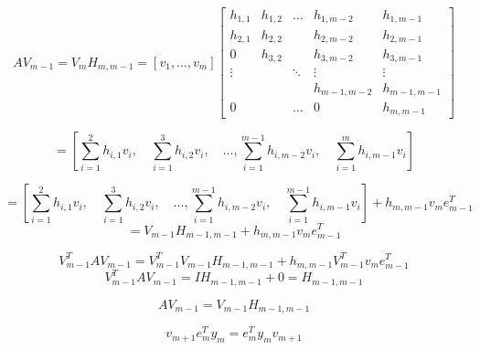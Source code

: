 

\[AV_{m-1}=V_m H_{m,m-1}
=[v_1,\ldots,v_m]
\begin{bmatrix}
    h_{1,1} & h_{1,2} & \ldots & h_{1,m-2} & h_{1,m-1}\\
    h_{2,1} & h_{2,2} & & h_{2,m-2} & h_{2,m-1} \\
    0 & h_{3,2} & & h_{3,m-2} & h_{3,m-1} \\ 
    \vdots & & \ddots & \vdots &\vdots\\
    & & & h_{m-1,m-2} & h_{m-1,m-1}\\
    0 & & \ldots  & 0 & h_{m,m-1}
\end{bmatrix}\]

\[=\left[\sum_{i=1}^{2}h_{i,1}v_i,\quad\sum_{i=1}^{3}h_{i,2}v_i,
\quad\ldots,\sum_{i=1}^{m-1}h_{i,m-2}v_i, \quad \sum_{i=1}^{m}h_{i,m-1}v_i\right]\]

\[=\left[\sum_{i=1}^{2}h_{i,1}v_i,\quad\sum_{i=1}^{3}h_{i,2}v_i,
\quad\ldots,\sum_{i=1}^{m-1}h_{i,m-2}v_i, \quad \sum_{i=1}^{m-1}h_{i,m-1}v_i\right]
+h_{m,m-1}v_m e_{m-1}^T\]
\[=V_{m-1} H_{m-1,m-1}+h_{m,m-1}v_m e^T_{m-1}\]





\[V^T_{m-1}AV_{m-1}=V^T_{m-1}V_{m-1} H_{m-1,m-1}+h_{m,m-1}V^T_{m-1}v_m e^T_{m-1}\]
\[V^T_{m-1}AV_{m-1}=IH_{m-1,m-1}+0=H_{m-1,m-1}\]


\[AV_{m-1}=V_{m-1}H_{m-1,m-1}\]


\[v_{m+1}e^T_m y_m=e^T_m y_m v_{m+1}\]